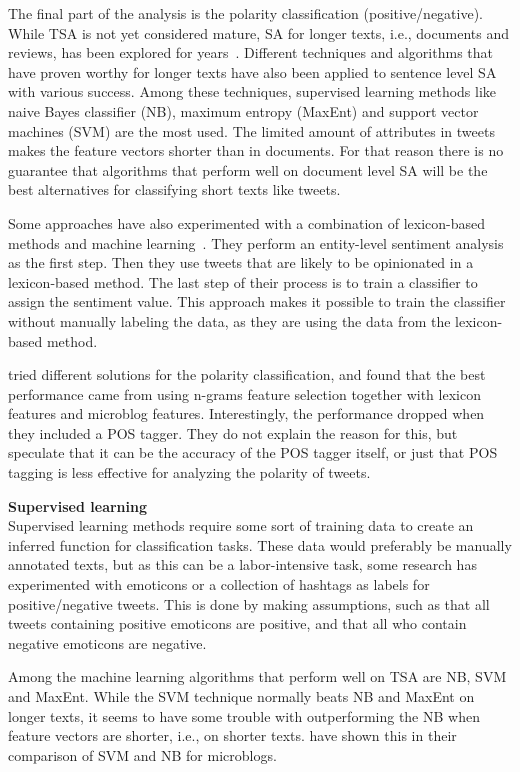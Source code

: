 The final part of the analysis is the polarity classification (positive/negative). While TSA is not yet considered mature, SA for longer texts, i.e., documents and reviews, has been explored for years~\citep{book:pang}. Different techniques and algorithms that have proven worthy for longer texts have also been applied to sentence level SA with various success. Among these techniques, supervised learning methods like naive Bayes classifier (NB), maximum entropy (MaxEnt) and support vector machines (SVM) are the most used. The limited amount of attributes in tweets makes the feature vectors shorter than in documents. For that reason there is no guarantee that algorithms that perform well on document level SA will be the best alternatives for classifying short texts like tweets.

Some approaches have also experimented with a combination of lexicon-based methods and  machine learning~\citep{article:mudinas}. They perform an entity-level sentiment analysis as the first step. Then they use tweets that are likely to be opinionated in a lexicon-based method. The last step of their process is to train a classifier to assign the sentiment value. This approach makes it possible to train the classifier without manually labeling the data, as they are using the data from the lexicon-based method.

\cite{article:omg} tried different solutions for the polarity classification, and found that the best performance came from using n-grams feature selection together with lexicon features and microblog features. Interestingly, the performance dropped when they included a POS tagger. They do not explain the reason for this, but speculate that it can be the accuracy of the POS tagger itself, or just that POS tagging is less effective for analyzing the polarity of tweets.\vspace{8mm}

\noindent
\textbf{Supervised learning} \\
\noindent
Supervised learning methods require some sort of training data to create an inferred function for classification tasks. These data would preferably be manually annotated texts, but as this can be a labor-intensive task, some research has experimented with emoticons or a collection of hashtags as labels for positive/negative tweets. This is done by making assumptions, such as that all tweets containing positive emoticons are positive, and that all who contain negative emoticons are negative.

Among the machine learning algorithms that perform well on TSA are NB, SVM and MaxEnt. While the SVM technique normally beats NB and MaxEnt on longer texts, it seems to have some trouble with outperforming the NB when feature vectors are shorter, i.e., on shorter texts. \cite{article:bermingham} have shown this in their comparison of SVM and NB for microblogs.\vspace{8 mm}

